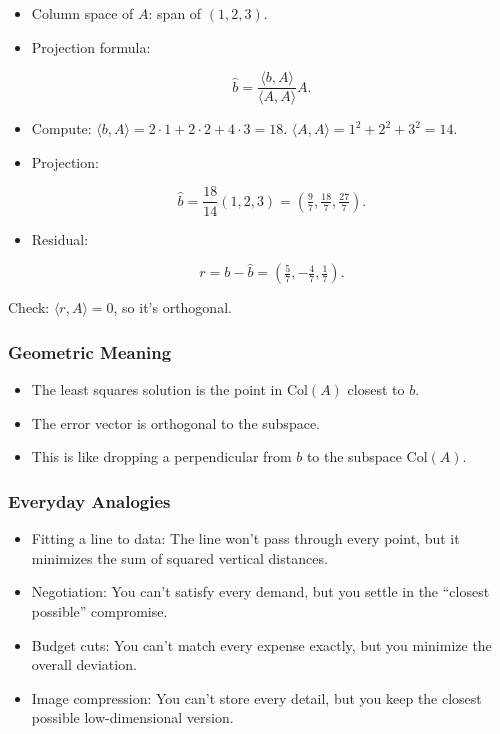 \documentclass[
  letterpaper,
  DIV=11,
  numbers=noendperiod]{scrreprt}
\providecommand{\tightlist}{%
  \setlength{\itemsep}{0pt}\setlength{\parskip}{0pt}}
\begin{document}
\begin{itemize}
\item
  Column space of \(A\): span of \((1,2,3)\).
\item
  Projection formula:

  \[
  \hat{b} = \frac{\langle b, A \rangle}{\langle A, A \rangle} A.
  \]
\item
  Compute: \(\langle b,A\rangle = 2\cdot1+2\cdot2+4\cdot3 = 18\).
  \(\langle A,A\rangle = 1^2+2^2+3^2=14\).
\item
  Projection:

  \[
  \hat{b} = \frac{18}{14}(1,2,3) = \left(\tfrac{9}{7}, \tfrac{18}{7}, \tfrac{27}{7}\right).
  \]
\item
  Residual:

  \[
  r = b - \hat{b} = \left(\tfrac{5}{7}, -\tfrac{4}{7}, \tfrac{1}{7}\right).
  \]
\end{itemize}

Check: \(\langle r,A\rangle = 0\), so it's orthogonal.

\subsubsection{Geometric Meaning}\label{geometric-meaning-20}

\begin{itemize}
\tightlist
\item
  The least squares solution is the point in \(\text{Col}(A)\) closest
  to \(b\).
\item
  The error vector is orthogonal to the subspace.
\item
  This is like dropping a perpendicular from \(b\) to the subspace
  \(\text{Col}(A)\).
\end{itemize}

\subsubsection{Everyday Analogies}\label{everyday-analogies-72}

\begin{itemize}
\tightlist
\item
  Fitting a line to data: The line won't pass through every point, but
  it minimizes the sum of squared vertical distances.
\item
  Negotiation: You can't satisfy every demand, but you settle in the
  ``closest possible'' compromise.
\item
  Budget cuts: You can't match every expense exactly, but you minimize
  the overall deviation.
\item
  Image compression: You can't store every detail, but you keep the
  closest possible low-dimensional version.
\end{itemize}
\end{document}
